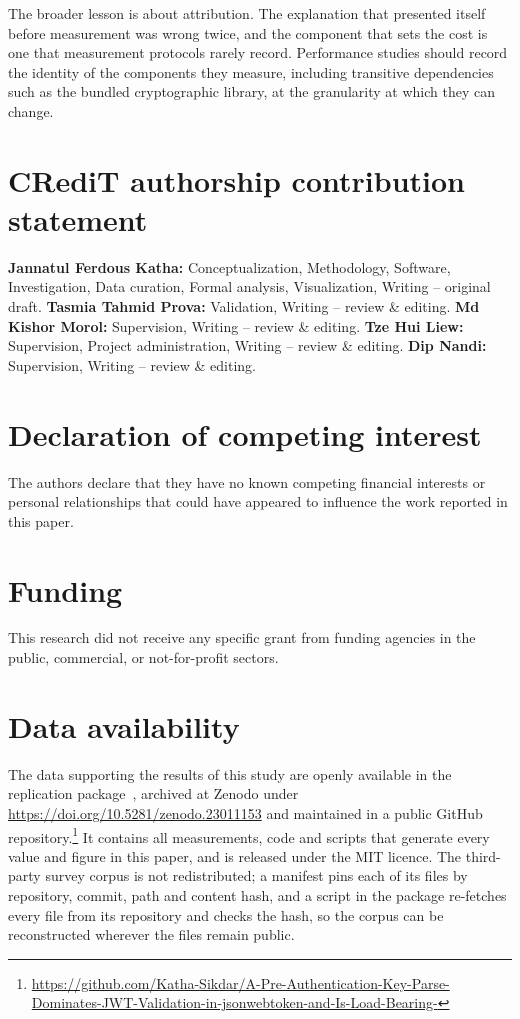 \documentclass[preprint,12pt,authoryear]{elsarticle}
\begin{document}
The broader lesson is about attribution. The explanation that presented itself
before measurement was wrong twice, and the component that sets the cost is
one that measurement protocols rarely record. Performance studies should record
the identity of the components they measure, including transitive dependencies
such as the bundled cryptographic library, at the granularity at which they can
change.


\section*{CRediT authorship contribution statement}
\textbf{Jannatul Ferdous Katha:} Conceptualization, Methodology, Software,
Investigation, Data curation, Formal analysis, Visualization, Writing --
original draft.
\textbf{Tasmia Tahmid Prova:} Validation, Writing -- review \& editing.
\textbf{Md Kishor Morol:} Supervision, Writing -- review \& editing.
\textbf{Tze Hui Liew:} Supervision, Project administration, Writing -- review
\& editing.
\textbf{Dip Nandi:} Supervision, Writing -- review \& editing.

\section*{Declaration of competing interest}
The authors declare that they have no known competing financial interests or
personal relationships that could have appeared to influence the work reported
in this paper.

\section*{Funding}
This research did not receive any specific grant from funding agencies in the
public, commercial, or not-for-profit sectors.

\section*{Data availability}
The data supporting the results of this study are openly available in the
replication package~\citep{artifact2026}, archived at Zenodo under
\url{https://doi.org/10.5281/zenodo.23011153} and maintained in a public
GitHub repository.\footnote{\url{https://github.com/Katha-Sikdar/A-Pre-Authentication-Key-Parse-Dominates-JWT-Validation-in-jsonwebtoken-and-Is-Load-Bearing-}}
It contains all measurements, code and scripts that generate every value and
figure in this paper, and is released under the MIT licence. The third-party
survey corpus is not redistributed; a manifest pins each of its
\ManifestFiles{} files by repository, commit, path and content hash, and a
script in the package re-fetches every file from its repository and checks the
hash, so the corpus can be reconstructed wherever the files remain public.
\end{document}
